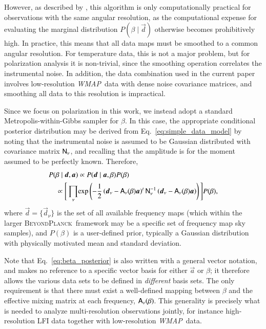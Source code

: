 \documentclass[twocolumn]{aa}
\def\WMAP{\textit{WMAP}}
\renewcommand{\d}[0]{\vec{d}}
\newcommand{\A}[0]{\tens{A}}
\renewcommand{\a}[0]{\vec{a}}
\newcommand{\N}[0]{\tens{N}}
\newcommand{\BP}{\textsc{BeyondPlanck}}
\newcommand{\?}[1]{\textcolor{red}{{\bf [#1]}}}
\begin{document}
However, as described by \citet{stivoli:2010}, this algorithm is only
computationally practical for observations with the same angular resolution, as
the computational expense for evaluating the marginal distribution $P(\beta\mid\d)$
otherwise becomes prohibitively high. In practice, this means that all data maps
must be smoothed to a common angular resolution. For temperature data, this is
not a major problem, but for polarization analysis it is non-trivial, since the
smoothing operation correlates the instrumental noise. In addition, the data
combination used in the current paper involves low-resolution \WMAP\ data with
dense noise covariance matrices, and smoothing all data to this resolution is
impractical.

Since we focus on polarization in this work, we instead adopt a
standard Metropolis-within-Gibbs sampler for $\beta$. In this case,
the appropriate conditional posterior distribution may be derived from
Eq.~\eqref{eq:simple_data_model} by noting that the instrumental noise
is assumed to be Gaussian distributed with covariance matrix
$\N_{\nu}$, and recalling that the amplitude is for the moment assumed to
be perfectly known. Therefore,
\begin{equation}
  \begin{aligned}[t]
  P(\beta\mid\d, \a) &\propto P(\d\mid\a, \beta) P(\beta)\label{eq:beta_posterior}\\
  \propto \Bigg[\prod_{\nu} &
    \mathrm \exp\left(-\frac{1}{2}\left(\d_{\nu}-\A_{\nu}(\beta)\a\right)^t\N_{\nu}^{-1}\left(\d_{\nu}-\A_{\nu}(\beta)\a\right)\right)\Bigg]P(\beta),
  \end{aligned}
\end{equation}
where $\d=\{\d_{\nu}\}$ is the set of all available frequency maps (which within
the larger \BP\ framework may be a specific set of frequency map sky samples),
and $P(\beta)$ is a user-defined prior, typically a Gaussian distribution with
physically motivated mean and standard deviation.

Note that Eq.~\eqref{eq:beta_posterior} is also written with a general vector
notation, and makes no reference to a specific vector basis for either $\a$ or
$\beta$; it therefore allows the various data sets to be defined in
\emph{different} basis sets. The only requirement is that there must exist a
well-defined mapping between $\beta$ and the effective mixing matrix at each
frequency, $\A_{\nu}(\beta)$. This generality is precisely what is needed to
analyze multi-resolution observations jointly, for instance high-resolution LFI
data together with low-resolution \WMAP\ data.
\end{document}
